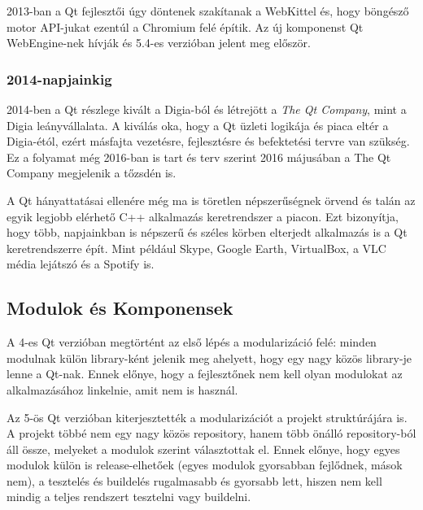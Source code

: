 \documentclass[12pt]{report}
\begin{document}
2013-ban a Qt fejlesztői úgy döntenek szakítanak a WebKittel és, hogy böngésző motor
API-jukat ezentúl a Chromium felé építik. \cite{bib:qt-blog-introducing-qtwebengine}
Az új komponenst Qt WebEngine-nek hívják és 5.4-es verzióban jelent meg először.
\cite{bib:qt-wiki-qt-history}

\subsubsection{2014-napjainkig}
2014-ben a Qt részlege kivált a Digia-ból és létrejött a \textit{The Qt Company},
mint a Digia leányvállalata. A kiválás oka, hogy a Qt üzleti logikája és piaca eltér a
Digia-étól, ezért másfajta vezetésre, fejlesztésre és befektetési tervre van szükség.
Ez a folyamat még 2016-ban is tart és terv szerint 2016 májusában a The Qt Company megjelenik
a tőzsdén is.
\cite{bib:qt-about-us}

A Qt hányattatásai ellenére még ma is töretlen népszerűségnek örvend és talán az egyik
legjobb elérhető C++ alkalmazás keretrendszer a piacon. Ezt bizonyítja,
hogy több, napjainkban is népszerű és széles körben elterjedt alkalmazás is a
Qt keretrendszerre épít. Mint például Skype, Google Earth, VirtualBox,
a VLC média lejátszó és a Spotify is.

\subsection{Modulok és Komponensek}
A 4-es Qt verzióban megtörtént az első lépés a modularizáció felé: minden modulnak külön
library-ként jelenik meg ahelyett, hogy egy nagy közös library-je lenne a Qt-nak.
Ennek előnye, hogy a fejlesztőnek nem kell olyan modulokat az alkalmazásához linkelnie,
amit nem is használ.

Az 5-ös Qt verzióban kiterjesztették a modularizációt a projekt struktúrájára is. A projekt
többé nem egy nagy közös repository, hanem több önálló repository-ból áll össze, melyeket
a modulok szerint választottak el. Ennek előnye, hogy egyes modulok külön is release-elhetőek
(egyes modulok gyorsabban fejlődnek, mások nem), a tesztelés és buildelés rugalmasabb és
gyorsabb lett, hiszen nem kell mindig a teljes rendszert tesztelni vagy buildelni.
\end{document}
